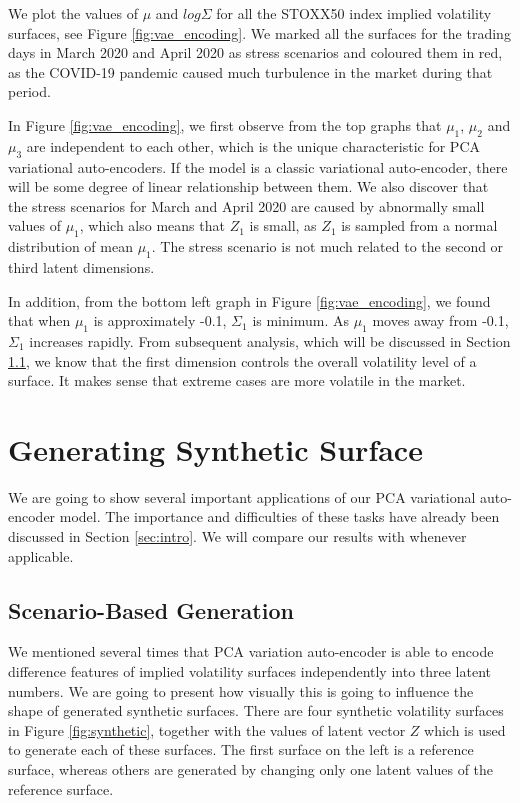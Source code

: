 \documentclass[format=sigconf]{acmart}
\begin{document}
We plot the values of $\mu$ and $log \Sigma$ for all the STOXX50 index implied volatility surfaces, see Figure \ref{fig:vae_encoding}. We marked all the surfaces for the trading days in March 2020 and April 2020 as stress scenarios and coloured them in red, as the COVID-19 pandemic caused much turbulence in the market during that period.

In Figure \ref{fig:vae_encoding}, we first observe from the top graphs that $\mu_{1}$, $\mu_{2}$ and $\mu_{3}$ are independent to each other, which is the unique characteristic for PCA variational auto-encoders. If the model is a classic variational auto-encoder, there will be some degree of linear relationship between them. We also discover that the stress scenarios for March and April 2020 are caused by abnormally small values of $\mu_{1}$, which also means that $Z_{1}$ is small, as $Z_{1}$ is sampled from a normal distribution of mean $\mu_{1}$. The stress scenario is not much related to the second or third latent dimensions.

In addition, from the bottom left graph in Figure \ref{fig:vae_encoding}, we found that when $\mu_{1}$ is approximately -0.1, $\Sigma_{1}$ is minimum. As $\mu_{1}$ moves away from -0.1, $\Sigma_{1}$ increases rapidly. From subsequent analysis, which will be discussed in Section \ref{sec:scenario-generation}, we know that the first dimension controls the overall volatility level of a surface. It makes sense that extreme cases are more volatile in the market.   


\section{Generating Synthetic Surface}
\label{sec:generate}
We are going to show several important applications of our PCA variational auto-encoder model. The importance and difficulties of these tasks have already been discussed in Section \ref{sec:intro}. We will compare our results with \cite{bergeron2022variational} whenever applicable.

\subsection{Scenario-Based Generation}
\label{sec:scenario-generation}
We mentioned several times that PCA variation auto-encoder is able to encode difference features of implied volatility surfaces independently into three latent numbers. We are going to present how visually this is going to influence the shape of generated synthetic surfaces. There are four synthetic volatility surfaces in Figure \ref{fig:synthetic}, together with the values of latent vector $Z$ which is used to generate each of these surfaces. The first surface on the left is a reference surface, whereas others are generated by changing only one latent values of the reference surface. 
\end{document}
